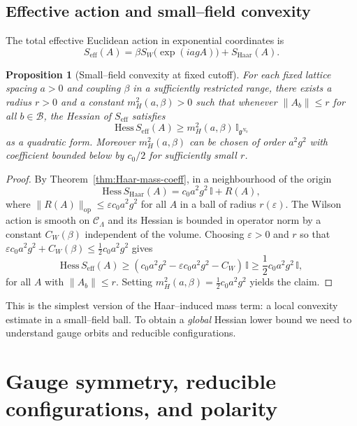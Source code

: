 \documentclass[11pt]{article}
\numberwithin{equation}{section}
\newtheorem{proposition}[theorem]{Proposition}
\begin{document}
\subsection{Effective action and small--field convexity}

The total effective Euclidean action in exponential coordinates is
\[
  S_{\mathrm{eff}}(A)
  = \beta S_W\big(\exp(iagA)\big) + S_{\mathrm{Haar}}(A).
\]

\begin{proposition}[Small--field convexity at fixed cutoff]
\label{prop:small-field-convexity}
For each fixed lattice spacing $a>0$ and coupling $\beta$ in a
sufficiently restricted range, there exists a radius $r>0$ and a
constant $m_H^2(a,\beta)>0$ such that whenever
$\|A_b\|\le r$ for all $b\in\mathcal{B}$, the Hessian of
$S_{\mathrm{eff}}$ satisfies
\[
  \mathrm{Hess}\,S_{\mathrm{eff}}(A)
  \ge m_H^2(a,\beta)\,\mathbb{I}_{\mathfrak{g}^{N_b}}
\]
as a quadratic form.  Moreover $m_H^2(a,\beta)$ can be chosen of order
$a^2 g^2$ with coefficient bounded below by $c_0/2$ for sufficiently
small $r$.
\end{proposition}

\begin{proof}
By Theorem~\ref{thm:Haar-mass-coeff}, in a neighbourhood of the origin
\[
  \mathrm{Hess}\,S_{\mathrm{Haar}}(A)
  = c_0 a^2 g^2\,\mathbb{I} + R(A),
\]
where $\|R(A)\|_{\mathrm{op}}\le \varepsilon c_0 a^2 g^2$ for all $A$
in a ball of radius $r(\varepsilon)$.  The Wilson action is smooth on
$\mathcal{C}_\Lambda$ and its Hessian is bounded in operator norm by a
constant $C_W(\beta)$ independent of the volume.  Choosing
$\varepsilon>0$ and $r$ so that
$\varepsilon c_0 a^2 g^2 + C_W(\beta) \le \frac{1}{2} c_0 a^2 g^2$ gives
\[
  \mathrm{Hess}\,S_{\mathrm{eff}}(A)
  \ge (c_0 a^2 g^2 - \varepsilon c_0 a^2 g^2 - C_W)\,\mathbb{I}
  \ge \frac{1}{2}c_0 a^2 g^2\,\mathbb{I},
\]
for all $A$ with $\|A_b\|\le r$.  Setting
$m_H^2(a,\beta)=\frac{1}{2}c_0 a^2 g^2$ yields the claim.
\end{proof}

This is the simplest version of the Haar--induced mass term: a local
convexity estimate in a small--field ball.  To obtain a \emph{global}
Hessian lower bound we need to understand gauge orbits and reducible
configurations.

\section{Gauge symmetry, reducible configurations, and polarity}
\end{document}
